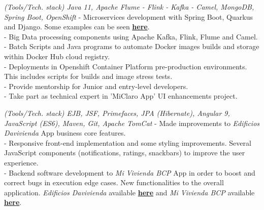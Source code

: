 \documentclass[]{CV-JuanCamiloFlorez}
\begin{document}
\begin{minipage}[t]{0.66\textwidth}
    \textit{(Tools/Tech. stack) Java 11, Apache Flume - Flink - Kafka - Camel, MongoDB, Spring Boot, OpenShift}
        - Microservices development with Spring Boot, Quarkus and Django. Some examples can be seen \textbf{\href{https://github.com/VanJFlorez/flink-kafka-fraud-detection}{here}}. \\
        - Big Data processing components using Apache Kafka, Flink, Flume and Camel. \\
        - Batch Scripts and Java programs to automate Docker images builds and storage within Docker Hub cloud registry. \\
        - Deployments in Openshift Container Platform pre-production environments. This includes scripts for builds and image stress tests. \\
        - Provide mentorship for Junior and entry-level developers. \\
        - Take part as technical expert in 'MiClaro App' UI enhancements project. \\
        \sectionsep

    \textit{(Tools/Tech. stack) EJB, JSF, Primefaces, JPA (Hibernate), Angular 9, JavaScript (ES6), Maven, Git, Apache TomCat}
        - Made improvements to \textit{Edificios Davivienda} App business core features. \\
        - Responsive front-end implementation and some styling improvements. Several JavaScript components (notifications, ratings, snackbars) to improve the user experience. \\
        - Backend software development to \textit{Mi Vivienda BCP} App in order to boost and correct bugs in execution edge cases. New functionalities to the overall application. \textit{Edificios Davivienda} available \textbf{\href{https://www.edificiosdavivienda.com}{here}} and \textit{Mi Vivienda BCP} available \textbf{\href{https://www.miviviendabcp.com.bo}{here}}. \\
        \sectionsep

 




\end{minipage}
\end{document}
